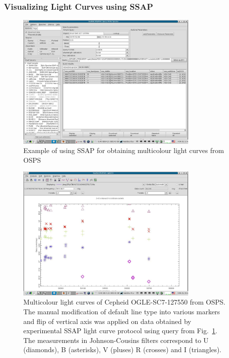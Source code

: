 \documentclass[final,authoryear,5p,times,twocolumn]{elsarticle}
\begin{document}
\subsubsection{Visualizing Light Curves using  SSAP}

\begin{figure}[t]
\begin{center}
\includegraphics[width=0.8\textwidth]{OGLE-SC7-127550_query.pdf}
\caption{Example of using SSAP for obtaining multicolour light curves from OSPS}
\label{fig:OGLE-SC7-127550_query}
\end{center}
\end{figure}

\begin{figure}[t]
\begin{center}
\includegraphics[width=0.8\textwidth]{OGLE-SC7-127550_plot.pdf}
\caption{Multicolour light curves of Cepheid OGLE-SC7-127550 from
  OSPS. The manual modification of default line type into various
  markers and flip of vertical axis was applied on data obtained by
  experimental SSAP light curve protocol using query from
  Fig.~\ref{fig:OGLE-SC7-127550_query}. The measurements in
  Johnson-Cousins filters correspond to U (diamonds), B (asterisks),
  V (pluses) R (crosses) and I (triangles).  }
\label{fig:OGLE-SC7-127550_plot}
\end{center}
\end{figure}
\end{document}
